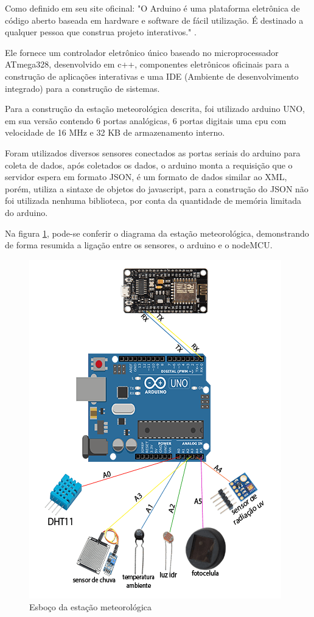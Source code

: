 Como definido em seu site oficinal: "O Arduino é uma plataforma eletrônica de código aberto baseada em hardware e software de fácil utilização. É destinado a qualquer pessoa que construa projeto interativos." \cite{arduino_about}.

Ele fornece um controlador eletrônico único baseado no microprocessador ATmega328, desenvolvido em c++, componentes eletrônicos oficinais para a construção de aplicações interativas e uma IDE (Ambiente de desenvolvimento integrado) para a construção de sistemas.

Para a construção da estação meteorológica descrita, foi utilizado arduino UNO, em sua versão contendo 6 portas analógicas, 6 portas digitais uma cpu com velocidade de 16 MHz e 32 KB de armazenamento interno.

Foram utilizados diversos sensores conectados as portas seriais do arduino para coleta de dados, após coletados os dados, o arduino monta a requisição que o servidor espera em formato JSON, é um formato de dados similar ao XML, porém, utiliza a sintaxe de objetos do javascript, para a construção do JSON não foi utilizada nenhuma biblioteca, por conta da quantidade de memória limitada do arduino.

Na figura \ref{fig:arduino_diagram}, pode-se conferir o diagrama da estação meteorológica, demonstrando de forma resumida a ligação entre os sensores, o arduino e o nodeMCU.

\begin{figure}[H]
    \centering
    \caption{Esboço da estação meteorológica \label{fig:arduino_diagram}}
    \includegraphics[scale=0.8]{diagrams/arduino.png}
    \hfill
{}
\end{figure}

